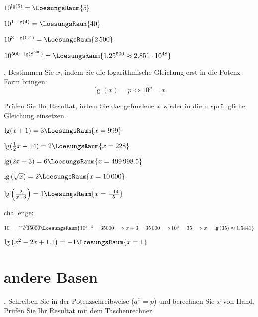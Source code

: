 \begin{bbwAufgabenBlock}
\item $10^{\lg(5)} =  \LoesungsRaum{5}$
\item $10^{1+\lg(4)} =  \LoesungsRaum{40}$
\item $10^{3-\lg(0.4)} =  \LoesungsRaum{2\,500}$
\item $10^{500-\lg(8^{500})} = \LoesungsRaum{1.25^{500} \approx 2.851\cdot{}10^{48}}$
\end{bbwAufgabenBlock}


\newpage

\textbf{\bbwAufgabenNummer{}.}
Bestimmen Sie $x$, indem Sie die logarithmische Gleichung erst in die
Potenz-Form bringen:
$$\lg(x) = p \Longleftrightarrow 10^p = x$$

Prüfen Sie Ihr Resultat, indem Sie das gefundene $x$ wieder in die
ursprüngliche Gleichung einsetzen.

\begin{bbwAufgabenBlock}
\item $\lg(x+1)= 3  \LoesungsRaum{x=999}$
\item $\lg(\frac12 x - 14)= 2  \LoesungsRaum{x=228}$
\item $\lg(2x+3)= 6  \LoesungsRaum{x=499\,998.5}$
\item $\lg\left(\sqrt{x}\right)= 2  \LoesungsRaum{x=10\,000}$
\item $\lg\left(\frac2{x+3}\right)=
1  \LoesungsRaum{x=\frac{-14}5}$

challenge:

\item $10 = \sqrt[x+3]{35000}   \LoesungsRaum{10^{x+3} = 35000 \Longrightarrow x+3 = 35\,000 \Longrightarrow 10^x = 35 \Longrightarrow x=\lg{}(35) \approx 1.5441}$


\item $\lg\left( x^2-2x+1.1 \right)= -1  \LoesungsRaum{x=1}$

\end{bbwAufgabenBlock}

\newpage
\section{andere Basen}

\textbf{\bbwAufgabenNummer{}.}
Schreiben Sie in der Potenzschreibweise ($a^x=p$) und berechnen Sie $x$ von
Hand. Prüfen Sie Ihr Resultat mit dem Taschenrechner.

